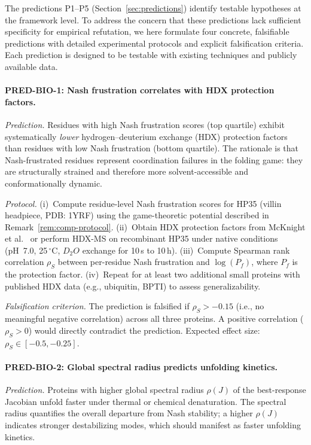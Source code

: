 \documentclass[12pt,a4paper]{article}
\theoremstyle{remark}
\begin{document}
The predictions P1--P5 (Section~\ref{sec:predictions}) identify testable hypotheses at the framework level. To address the concern that these predictions lack sufficient specificity for empirical refutation, we here formulate four concrete, falsifiable predictions with detailed experimental protocols and explicit falsification criteria. Each prediction is designed to be testable with existing techniques and publicly available data.

\paragraph{PRED-BIO-1: Nash frustration correlates with HDX protection factors.}

\textit{Prediction.}
Residues with high Nash frustration scores (top quartile) exhibit systematically \emph{lower} hydrogen--deuterium exchange (HDX) protection factors than residues with low Nash frustration (bottom quartile). The rationale is that Nash-frustrated residues represent coordination failures in the folding game: they are structurally strained and therefore more solvent-accessible and conformationally dynamic.

\textit{Protocol.}
(i)~Compute residue-level Nash frustration scores for HP35 (villin headpiece, PDB: 1YRF) using the game-theoretic potential described in Remark~\ref{rem:comp-protocol}.
(ii)~Obtain HDX protection factors from McKnight et al.\ \cite{McKnight1996} or perform HDX-MS on recombinant HP35 under native conditions (pH~7.0, 25$\,^\circ$C, $D_2O$ exchange for 10\,s to 10\,h).
(iii)~Compute Spearman rank correlation $\rho_S$ between per-residue Nash frustration and $\log(P_f)$, where $P_f$ is the protection factor.
(iv)~Repeat for at least two additional small proteins with published HDX data (e.g., ubiquitin, BPTI) to assess generalizability.

\textit{Falsification criterion.}
The prediction is falsified if $\rho_S > -0.15$ (i.e., no meaningful negative correlation) across all three proteins. A positive correlation ($\rho_S > 0$) would directly contradict the prediction. Expected effect size: $\rho_S \in [-0.5, -0.25]$.

\paragraph{PRED-BIO-2: Global spectral radius predicts unfolding kinetics.}

\textit{Prediction.}
Proteins with higher global spectral radius $\rho(J)$ of the best-response Jacobian unfold faster under thermal or chemical denaturation. The spectral radius quantifies the overall departure from Nash stability; a higher $\rho(J)$ indicates stronger destabilizing modes, which should manifest as faster unfolding kinetics.
\end{document}

